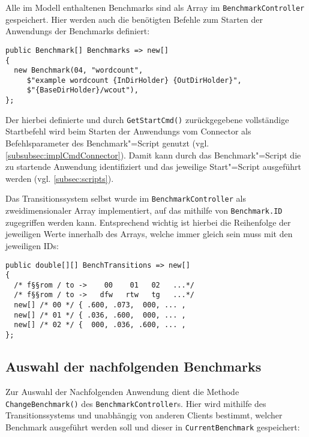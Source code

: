 Alle im Modell enthaltenen Benchmarks sind als Array im \texttt{BenchmarkController} gespeichert.
Hier werden auch die benötigten Befehle zum Starten der \glspl{Anwendung} der Benchmarks definiert:

\begin{lstlisting}[label=lst:benchmarkDefinition,style=cs,
caption={[Definition der verfügbaren Benchmarks im BenchmarkController]
    Definition der verfügbaren Benchmarks im \texttt{BenchmarkController} (gekürzt)}]
public Benchmark[] Benchmarks => new[]
{
  new Benchmark(04, "wordcount",
     $"example wordcount {InDirHolder} {OutDirHolder}",
     $"{BaseDirHolder}/wcout"),
};
\end{lstlisting}

Der hierbei definierte und durch \texttt{GetStartCmd()} zurückgegebene vollständige Startbefehl wird beim Starten der \glspl{Anwendung} vom Connector als Befehlsparameter des Benchmark"=Script genutzt (vgl. \cref{subsubsec:implCmdConnector}).
Damit kann durch das Benchmark"=Script die zu startende \gls{Anwendung} identifiziert und das jeweilige Start"=Script ausgeführt werden (vgl. \cref{subsec:scripts}).

Das Transitionssystem selbst wurde im \texttt{BenchmarkController} als zweidimensionaler Array implementiert, auf das mithilfe von \texttt{Benchmark.ID} zugegriffen werden kann.
Entsprechend wichtig ist hierbei die Reihenfolge der jeweiligen Werte innerhalb des Arrays, welche immer gleich sein muss mit den jeweiligen IDs:

\begin{lstlisting}[label=lst:transitionSystemImpl,style=cs,
caption={[Implementierung des Transitionssystems im BenchmarkController]
    Implementierung des Transitionssystems im \texttt{BenchmarkController} (gekürzt)}]
public double[][] BenchTransitions => new[]
{
  /* f§§rom / to ->    00    01   02   ...*/
  /* f§§rom / to ->   dfw   rtw   tg   ...*/
  new[] /* 00 */ { .600, .073,  000, ... ,
  new[] /* 01 */ { .036, .600,  000, ... ,
  new[] /* 02 */ {  000, .036, .600, ... ,
};
\end{lstlisting}

\subsection{Auswahl der nachfolgenden Benchmarks}
\label{subsec:selectionNextBenchmark}

Zur Auswahl der Nachfolgenden \gls{Anwendung} dient die Methode \texttt{ChangeBenchmark()} des \texttt{BenchmarkController}s.
Hier wird mithilfe des Transitionssystems und unabhängig von anderen Clients bestimmt, welcher Benchmark ausgeführt werden soll und dieser in \texttt{CurrentBenchmark} gespeichert:

